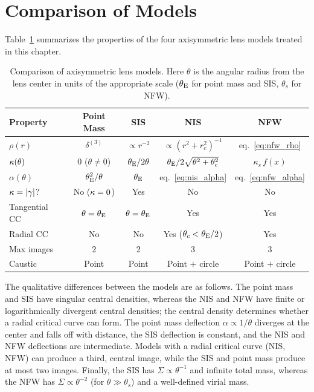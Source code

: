 \section{Comparison of Models}
\label{sec:model_comparison}

Table~\ref{tab:model_comparison} summarizes the properties of the
four axisymmetric lens models treated in this chapter.

\begin{table}[ht]
\centering
\caption{Comparison of axisymmetric lens models.  Here
$\theta$ is the angular radius from the lens center in units of the
appropriate scale ($\theta_{\mathrm{E}}$ for point mass and SIS, $\theta_s$ for
NFW).}
\label{tab:model_comparison}
\begin{tabular}{@{}lcccc@{}}
\toprule
Property & Point Mass & SIS & NIS & NFW \\
\midrule
$\rho(r)$ & $\delta^{(3)}$ & $\propto r^{-2}$ & $\propto (r^2+r_c^2)^{-1}$ & eq.~\eqref{eq:nfw_rho} \\[4pt]
$\kappa(\theta)$ & $0$ ($\theta \neq 0$) & $\theta_{\mathrm{E}} / 2\theta$ & $\theta_{\mathrm{E}} / 2\sqrt{\theta^2+\theta_c^2}$ & $\kappa_s\, f(x)$ \\[4pt]
$\alpha(\theta)$ & $\theta_{\mathrm{E}}^2/\theta$ & $\theta_{\mathrm{E}}$ & eq.~\eqref{eq:nis_alpha} & eq.~\eqref{eq:nfw_alpha} \\[4pt]
$\kappa = |\gamma|$? & No ($\kappa=0$) & Yes & No & No \\[4pt]
Tangential CC & $\theta = \theta_{\mathrm{E}}$ & $\theta = \theta_{\mathrm{E}}$ & Yes & Yes \\[4pt]
Radial CC & No & No & Yes ($\theta_c < \theta_{\mathrm{E}}/2$) & Yes \\[4pt]
Max images & 2 & 2 & 3 & 3 \\[4pt]
Caustic & Point & Point & Point $+$ circle & Point $+$ circle \\
\bottomrule
\end{tabular}
\end{table}

The qualitative differences between the models are as follows.  The
point mass and SIS have singular central densities, whereas the NIS
and NFW have finite or logarithmically divergent central densities;
the central density determines whether a radial critical curve can
form.  The point mass deflection $\alpha \propto 1/\theta$ diverges at
the center and falls off with distance, the SIS deflection is
constant, and the NIS and NFW deflections are intermediate.  Models
with a radial critical curve (NIS, NFW) can produce a third, central
image, while the SIS and point mass produce at most two images.
Finally, the SIS has $\Sigma \propto
\theta^{-1}$ and infinite total mass, whereas the NFW has
$\Sigma \propto \theta^{-2}$ (for $\theta \gg \theta_s$) and
a well-defined virial mass.

